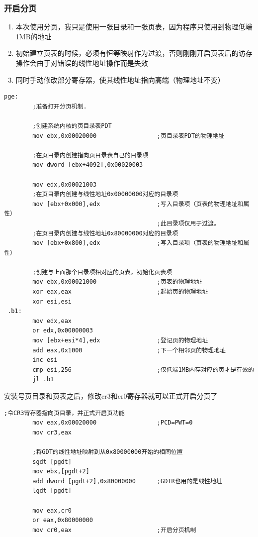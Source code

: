 \documentclass[a4paper,11pt,UTF8]{ctexart}
\begin{document}
		\subsubsection{开启分页}
			\begin{enumerate}
				\item 本次使用分页，我只是使用一张目录和一张页表，因为程序只使用到物理低端1MB的地址
				\item 初始建立页表的时候，必须有恒等映射作为过渡，否则刚刚开启页表后的访存操作会由于对错误的线性地址操作而是失效
				\item 同时手动修改部分寄存器，使其线性地址指向高端（物理地址不变）
			\end{enumerate}
	\begin{lstlisting}[caption={手动完善页目录和页表},tabsize=4,basicstyle=\footnotesize,captionpos=b]
		pge:
		;准备打开分页机制.
			 
		;创建系统内核的页目录表PDT
		mov ebx,0x00020000                 ;页目录表PDT的物理地址
		
		;在页目录内创建指向页目录表自己的目录项
		mov dword [ebx+4092],0x00020003 

		mov edx,0x00021003                 
		;在页目录内创建与线性地址0x00000000对应的目录项
		mov [ebx+0x000],edx                ;写入目录项（页表的物理地址和属性）      
										   ;此目录项仅用于过渡。
		;在页目录内创建与线性地址0x80000000对应的目录项
		mov [ebx+0x800],edx                ;写入目录项（页表的物理地址和属性）

		;创建与上面那个目录项相对应的页表，初始化页表项 
		mov ebx,0x00021000                 ;页表的物理地址
		xor eax,eax                        ;起始页的物理地址 
		xor esi,esi
 .b1:       
		mov edx,eax
		or edx,0x00000003                                                      
		mov [ebx+esi*4],edx                ;登记页的物理地址
		add eax,0x1000                     ;下一个相邻页的物理地址 
		inc esi
		cmp esi,256                        ;仅低端1MB内存对应的页才是有效的 
		jl .b1
	\end{lstlisting}

	安装号页目录和页表之后，修改cr3和cr0寄存器就可以正式开启分页了
	\begin{lstlisting}[caption={开启 paging},tabsize=4,basicstyle=\footnotesize,captionpos=b]
		;令CR3寄存器指向页目录，并正式开启页功能 
		mov eax,0x00020000                 ;PCD=PWT=0
		mov cr3,eax

		;将GDT的线性地址映射到从0x80000000开始的相同位置 
		sgdt [pgdt]
		mov ebx,[pgdt+2]
		add dword [pgdt+2],0x80000000      ;GDTR也用的是线性地址
		lgdt [pgdt]

		mov eax,cr0
		or eax,0x80000000
		mov cr0,eax                        ;开启分页机制
	\end{lstlisting}
\end{document}
